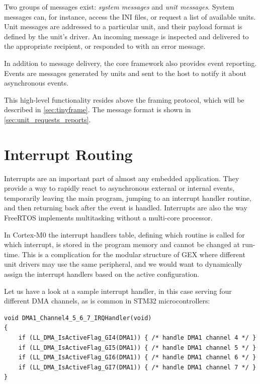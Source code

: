 Two groups of messages exist: \textit{system messages} and \textit{unit messages}. System messages can, for instance, access the INI files, or request a list of available units. Unit messages are addressed to a particular unit, and their payload format is defined by the unit's driver. An incoming message is inspected and delivered to the appropriate recipient, or responded to with an error message.

In addition to message delivery, the core framework also provides event reporting. Events are messages generated by units and sent to the host to notify it about asynchronous events.

This high-level functionality resides above the framing protocol, which will be described in \cref{sec:tinyframe}. The message format is shown in \cref{sec:unit_requests_reports}.


\section{Interrupt Routing} \label{sec:irq_routing}

Interrupts are an important part of almost any embedded application. They provide a way to rapidly react to asynchronous external or internal events, temporarily leaving the main program, jumping to an interrupt handler routine, and then returning back after the event is handled. Interrupts are also the way FreeRTOS implements multitasking without a multi-core processor.

In \arm Cortex-M0 the interrupt handlers table, defining which routine is called for which interrupt, is stored in the program memory and cannot be changed at run-time. This is a complication for the modular structure of GEX where different unit drivers may use the same peripheral, and we would want to dynamically assign the interrupt handlers based on the active configuration. 


Let us have a look at a sample interrupt handler, in this case serving four different \gls{DMA} channels, as is common in STM32 microcontrollers:

\begin{verbatim}
void DMA1_Channel4_5_6_7_IRQHandler(void)
{
    if (LL_DMA_IsActiveFlag_GI4(DMA1)) { /* handle DMA1 channel 4 */ }
    if (LL_DMA_IsActiveFlag_GI5(DMA1)) { /* handle DMA1 channel 5 */ }
    if (LL_DMA_IsActiveFlag_GI6(DMA1)) { /* handle DMA1 channel 6 */ }
    if (LL_DMA_IsActiveFlag_GI7(DMA1)) { /* handle DMA1 channel 7 */ }
}
\end{verbatim}

